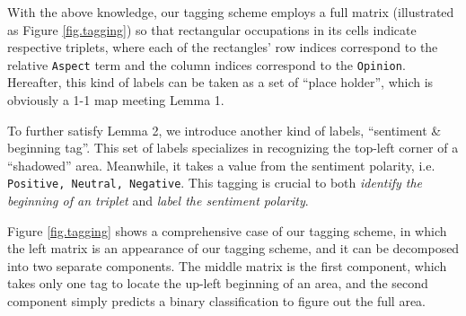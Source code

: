 \documentclass[11pt]{article}
\begin{document}


With the above knowledge, our tagging scheme employs a full matrix (illustrated as Figure \ref{fig.tagging}) so that rectangular occupations in its cells indicate respective triplets, where each of the rectangles' row indices correspond to the relative \texttt{Aspect} term and the column indices correspond to the \texttt{Opinion}. Hereafter, this kind of labels can be taken as a set of ``place holder'', which is obviously a 1-1 map meeting Lemma 1. 


To further satisfy Lemma 2, we introduce another kind of labels, ``sentiment \& beginning tag''. This set of labels specializes in recognizing the top-left corner of a ``shadowed'' area. Meanwhile, it takes a value from the sentiment polarity, i.e. \texttt{Positive, Neutral, Negative}. This tagging is crucial to both \textit{identify the beginning of an triplet} and \textit{label the sentiment polarity}. %

Figure \ref{fig.tagging} shows a comprehensive case of our tagging scheme, in which the left matrix is an appearance of our tagging scheme, and it can be decomposed into two separate components. The middle matrix is the first component,  which takes only one tag to locate the up-left beginning of an area, and the second component simply predicts a binary classification to figure out the full area. 
\end{document}
